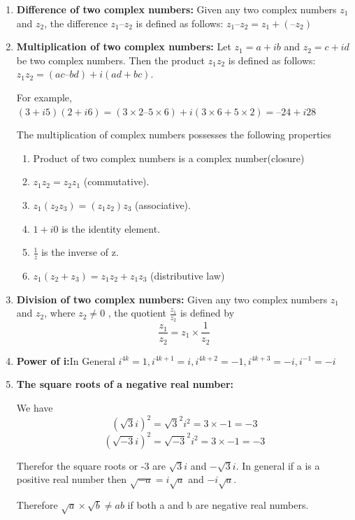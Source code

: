 \documentclass{article}
\begin{document}
\begin{multicols}{2}
\begin{enumerate}
\begin{enumerate}
    \end{enumerate}
    \item \textbf{Difference of two complex numbers:} Given any two complex numbers $z_1$ and
$z_2$, the difference $z_1 – z_2$ is defined as follows:
$z_1 – z_2 = z_1 + (– z_2)$

\item \textbf{Multiplication of two complex numbers:} Let $z_1 = a + ib$ and $z_2 = c + id$ be two complex numbers.
Then the product $z_1z_2$ is defined as follows:
$z_1z_2 = (ac – bd) + i(ad + bc)$.

For example, $(3 + i5) (2 + i6) = (3 \times 2 – 5 \times 6) + i(3 \times 6 + 5 \times 2) = – 24 + i28$

The multiplication of complex numbers possesses the following properties
\begin{enumerate}
    \item Product of two complex numbers is a complex number(closure)
    \item  $z_1z_2 = z_2z_1$ (commutative).
    \item  $z_1(z_2z_3) = (z_1z_2)z_3$ (associative).
    \item  $1 + i0$ is the identity element.
    \item $\frac{1}{z}$ is the inverse of z.
    \item $z_1(z_2 + z_3) = z_1z_2 + z_1z_3$ (distributive law)
    
\end{enumerate}
    \item \textbf{Division of two complex numbers:} Given any two complex numbers $z_1$ and $z_2$,
where $z_2 \not = $0 , the quotient $\frac{z_1}{z_2}$ is defined by
$$\frac{z_1}{z_2}=z_1 \times \frac{1}{z_2}$$

\item \textbf{Power of i:}In General $i^{4k} = 1, i^{4k+1} = i, i^{4k+2} = -1, i^{4k+3} = -i, i^{-1}=-i$

\item \textbf{The square roots of a negative real number:}

We have 
$$(\sqrt{3}i)^2=\sqrt{3}^2 i^2=3 \times -1 =-3$$
$$(\sqrt{-3}i)^2=\sqrt{-3}^2 i^2=3 \times -1 =-3$$

Therefor the square roots or -3 are $\sqrt{3}i$ and $-\sqrt{3}i$. In general if  a is a positive real number then 
$\sqrt{-a}=i\sqrt{a}$ and $-i\sqrt{a}$.

Therefore $\sqrt{a} \times \sqrt{b} \not = ab$ if both a and b are negative real numbers.


\end{enumerate}
\end{multicols}
\end{document}
